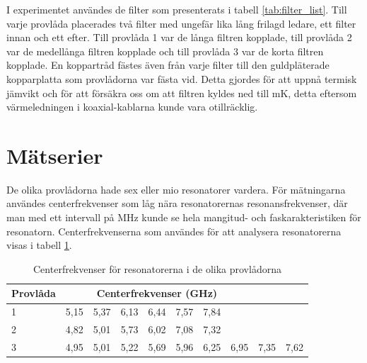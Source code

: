 \documentclass[main.tex]{subfiles}
\begin{document}
I experimentet användes de filter som presenterats i tabell \ref{tab:filter_list}. Till varje provlåda placerades två filter med ungefär lika lång frilagd ledare, ett filter innan och ett efter. Till provlåda 1 var de långa filtren kopplade, till provlåda 2 var de medellånga filtren kopplade och till provlåda 3 var de korta filtren kopplade. En koppartråd fästes även från varje filter till den guldpläterade kopparplatta som provlådorna var fästa vid. Detta gjordes för att uppnå termisk jämvikt och för att försäkra oss om att filtren kyldes ned till \unit[10]{mK}, detta eftersom värmeledningen i koaxial-kablarna kunde vara otillräcklig. %


\section{Mätserier}


De olika provlådorna hade sex eller mio resonatorer vardera. För mätningarna användes centerfrekvenser som låg nära resonatorernas resonansfrekvenser, där man med ett intervall på \unit[3]{MHz} kunde se hela mangitud- och faskarakteristiken för resonatorn. Centerfrekvenserna som användes för att analysera resonatorerna visas i tabell \ref{tab:utanfil}. 

\begin{table}[h]
    \centering
        \caption{Centerfrekvenser för resonatorerna i de olika provlådorna}
    \label{tab:utanfil}
    \begin{tabular}{lccccccccc}
    \toprule
        \textbf{Provlåda}  & \multicolumn{7}{c}{Centerfrekvenser (GHz)} \\
        \midrule
        1 & 5,15 & 5,37 & 6,13 & 6,44 & 7,57 & 7,84 &\\
        2 & 4,82 & 5,01 & 5,73 & 6,02 & 7,08  &  7,32 & \\
        3 & 4,95 & 5,01 & 5,22 & 5,69 & 5,96 & 6,25 & 6,95 & 7,35 & 7,62\\
        \bottomrule
    \end{tabular}
\end{table}

\end{document}
